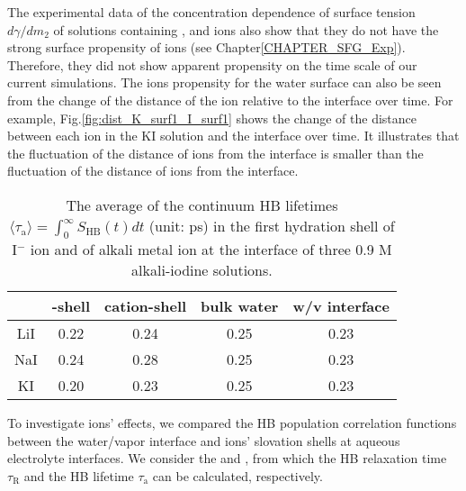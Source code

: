 The experimental data of the concentration dependence of surface tension $d\gamma/dm_2$ of solutions 
containing \Li, \Na and \K ions also show that they do not have the strong surface propensity of \I ions (see Chapter\thinspace\ref{CHAPTER_SFG_Exp}).
Therefore, they did not show apparent propensity on the time scale of our current simulations.
The ions propensity for the water surface can also be seen from the change of the distance of the ion relative to the interface over time. 
For example, Fig.\thinspace\ref{fig:dist_K_surf1_I_surf1} shows the change of the distance between each ion in the KI solution 
and the interface over time. It illustrates that the fluctuation of the distance of \I ions from the interface 
is smaller than the fluctuation of the distance of \K ions from the interface.

%
\begin{table}[H]
\centering
\caption{\label{tab:tau_hb_alkali_iodine} 
The average of the continuum HB lifetimes $\langle\tau_{\text{a}}\rangle=\int_0^\infty S_\text{HB}(t) dt$ (unit: ps) in the first hydration shell of I$^-$ ion 
and of alkali metal ion at the interface of three 0.9 M alkali-iodine solutions.
}
\begin{tabular}{ccccc}
  &\I-shell &cation-shell & bulk water & w/v interface \\
\hline
 LiI & 0.22 & 0.24 & 0.25 & 0.23\\
 NaI & 0.24 & 0.28 & 0.25 & 0.23\\
 KI  & 0.20 & 0.23 & 0.25 &0.23\\
\end{tabular}
\end{table} 

To investigate ions' effects, we compared the HB population correlation functions between the water/vapor interface 
and ions' slovation shells at aqueous electrolyte interfaces.
We consider the \CHB and \SHB, from which the HB relaxation time $\tau_\text{R}$ and the HB lifetime $\tau_\text{a}$ can be calculated, respectively.

